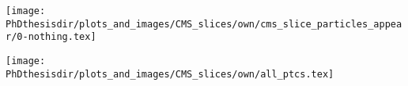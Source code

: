 \begin{frame}
\addtocounter{framenumber}{-1}
\transdissolve[duration=2]
\begin{center}
\texttt{[image: \\PhDthesisdir/plots\_and\_images/CMS\_slices/own/cms\_slice\_particles\_appear/0-nothing.tex]}
\end{center}
\end{frame}

%
%
%

\begin{frame}
\addtocounter{framenumber}{-1}
\transwipe
\begin{center}
\texttt{[image: \\PhDthesisdir/plots\_and\_images/CMS\_slices/own/all\_ptcs.tex]}
\end{center}
\end{frame}